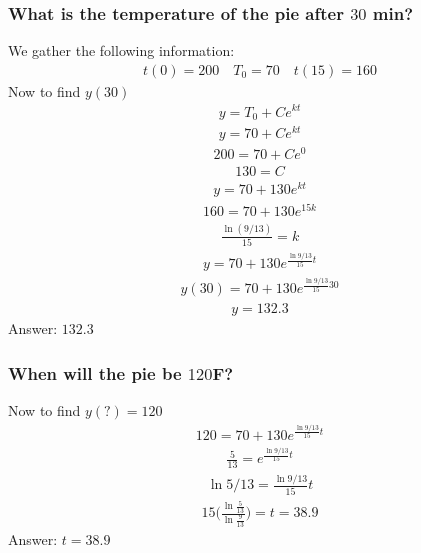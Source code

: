 \documentclass{article}
\begin{document}
\subsubsection{What is the temperature of the pie after $30$ min?}
We gather the following information:
\begin{align*}
	t(0) = 200 \quad T_0 = 70 \quad t(15) = 160
\end{align*}
Now to find $y(30)$
\begin{align*}
	y = T_0 + Ce^{kt}
\end{align*}
\begin{align*}
	y = 70 + Ce^{kt}
\end{align*}
\begin{align*}
	200 = 70 + Ce^0
\end{align*}
\begin{align*}
	130 = C
\end{align*}
\begin{align*}
	y = 70 + 130e^{kt}
\end{align*}
\begin{align*}
	160 = 70 + 130e^{15k}
\end{align*}
\begin{align*}
	\frac{\ln{( 9/13)}}{15} = k
\end{align*}
\begin{align*}
	y = 70 + 130e^{\frac{\ln{9/13}}{15} t}
\end{align*}
\begin{align*}
	y(30) = 70 + 130e^{\frac{\ln{9/13}}{15} 30}
\end{align*}
\begin{align*}
	y = 132.3
\end{align*}
Answer: $132.3$

\subsubsection{When will the pie be $120$F?}
Now to find $y(?) = 120$
\begin{align*}
	120 = 70 + 130e^{\frac{\ln{9/13}}{15} t}
\end{align*}
\begin{align*}
	\frac{5}{13} = e^{\frac{\ln{9/13}}{15} t}
\end{align*}
\begin{align*}
	\ln{5/13} = \frac{\ln{9/13}}{15} t
\end{align*}
\begin{align*}
	15 \bigg( \frac{\ln{\frac{5}{13}}}{\ln{\frac{9}{13}}} \bigg) = t = 38.9
\end{align*}
Answer: $t = 38.9$
\end{document}
